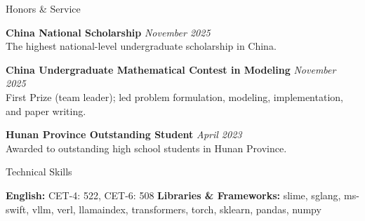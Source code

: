 \documentclass{resume}
\begin{document}

\begin{rSection}{Honors \& Service}

{\bf China National Scholarship} \hfill {\em November 2025} \\
The highest national-level undergraduate scholarship in China.

{\bf China Undergraduate Mathematical Contest in Modeling} \hfill {\em November 2025} \\
First Prize (team leader); led problem formulation, modeling, implementation, and paper writing.

{\bf Hunan Province Outstanding Student} \hfill {\em April 2023} \\
Awarded to outstanding high school students in Hunan Province.

\end{rSection}


\begin{rSection}{Technical Skills}

\textbf{English:} CET-4: 522, CET-6: 508 \quad \textbf{Libraries \& Frameworks:} slime, sglang, ms-swift, vllm, verl, llamaindex, transformers, torch, sklearn, pandas, numpy

\end{rSection}
\end{document}
